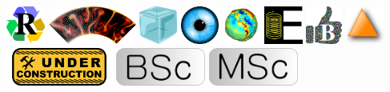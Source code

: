 \includegraphics[height=1.25cm]{images/pictograms/replication}
\includegraphics[height=1.25cm]{images/pictograms/aspect_logo}
\includegraphics[height=1.25cm]{images/pictograms/ice}
\includegraphics[height=1.25cm]{images/pictograms/visualisation}
\includegraphics[height=1.25cm]{images/pictograms/gravity}
\includegraphics[height=1.25cm]{images/pictograms/elasticity}
\includegraphics[height=1.25cm]{images/pictograms/benchmark}
\includegraphics[height=1.25cm]{images/pictograms/triangle}
\includegraphics[height=1.25cm]{images/pictograms/under_construction}
\includegraphics[height=1.25cm]{images/pictograms/bsc}
\includegraphics[height=1.25cm]{images/pictograms/msc}
